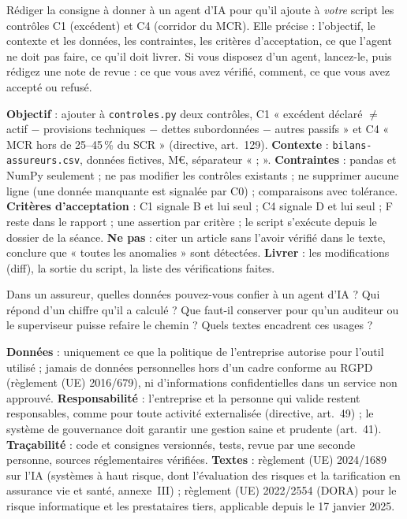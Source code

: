 \documentclass[11pt,a4paper]{article}
\begin{document}
\begin{exercice}
Rédiger la consigne à donner à un agent d'IA pour qu'il ajoute à \emph{votre} script les contrôles
C1 (excédent) et C4 (corridor du MCR). Elle précise : l'objectif, le contexte et les données, les
contraintes, les critères d'acceptation, ce que l'agent ne doit pas faire, ce qu'il doit livrer.
Si vous disposez d'un agent, lancez-le, puis rédigez une note de revue : ce que vous avez vérifié,
comment, ce que vous avez accepté ou refusé.
\end{exercice}
\begin{corrige}
\small
\textbf{Objectif} : ajouter à \texttt{controles.py} deux contrôles, C1 « excédent déclaré $\neq$
actif $-$ provisions techniques $-$ dettes subordonnées $-$ autres passifs » et C4 « MCR hors de
25--45\,\% du SCR » (directive, art.~129). \textbf{Contexte} : \texttt{bilans-assureurs.csv},
données fictives, M\euro, séparateur « ; ». \textbf{Contraintes} : pandas et NumPy seulement ;
ne pas modifier les contrôles existants ; ne supprimer aucune ligne (une donnée manquante est
signalée par C0) ; comparaisons avec tolérance. \textbf{Critères d'acceptation} : C1 signale B et
lui seul ; C4 signale D et lui seul ; F reste dans le rapport ; une assertion par critère ; le
script s'exécute depuis le dossier de la séance. \textbf{Ne pas} : citer un article sans l'avoir
vérifié dans le texte, conclure que « toutes les anomalies » sont détectées. \textbf{Livrer} :
les modifications (diff), la sortie du script, la liste des vérifications faites.
\end{corrige}

\begin{exercice}
Dans un assureur, quelles données pouvez-vous confier à un agent d'IA ? Qui répond d'un chiffre
qu'il a calculé ? Que faut-il conserver pour qu'un auditeur ou le superviseur puisse refaire le
chemin ? Quels textes encadrent ces usages ?
\end{exercice}
\begin{corrige}
\textbf{Données} : uniquement ce que la politique de l'entreprise autorise pour l'outil utilisé ;
jamais de données personnelles hors d'un cadre conforme au RGPD (règlement (UE) 2016/679), ni
d'informations confidentielles dans un service non approuvé. \textbf{Responsabilité} : l'entreprise
et la personne qui valide restent responsables, comme pour toute activité externalisée (directive,
art.~49) ; le système de gouvernance doit garantir une gestion saine et prudente (art.~41).
\textbf{Traçabilité} : code et consignes versionnés, tests, revue par une seconde personne, sources
réglementaires vérifiées. \textbf{Textes} : règlement (UE) 2024/1689 sur l'IA (systèmes à haut
risque, dont l'évaluation des risques et la tarification en assurance vie et santé, annexe~III) ;
règlement (UE) 2022/2554 (DORA) pour le risque informatique et les prestataires tiers, applicable
depuis le 17 janvier 2025.
\end{corrige}
\end{document}
